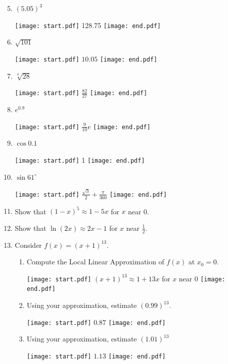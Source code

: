 \documentclass[12pt]{article}
\begin{document}
\begin{enumerate}
\setcounter{enumi}{4}

\item $(5.05)^3$ 

\texttt{[image: start.pdf]}
{{128.75}}
\texttt{[image: end.pdf]}


\item $\sqrt{101}$ 

\texttt{[image: start.pdf]}
{{$10.05$}}
\texttt{[image: end.pdf]}


\item $\sqrt[3]{28}$ 

\texttt{[image: start.pdf]}
{{$\frac{82}{27}$}}
\texttt{[image: end.pdf]}


\item $e^{0.9}$ 

\texttt{[image: start.pdf]}
{{$\frac{9}{10}e$}}
\texttt{[image: end.pdf]}


\item $\cos{0.1}$

\texttt{[image: start.pdf]}
{{1}}
\texttt{[image: end.pdf]}


\item $\sin{61^{\circ}}$ 

\texttt{[image: start.pdf]}
{{$\frac{\sqrt{3}}{2}+\frac{\pi}{360} $}}
\texttt{[image: end.pdf]}


\item Show that $(1-x)^5 \approx 1-5x$ for $x$ near 0.

\item Show that $\ln{(2x)} \approx 2x-1$ for $x$ near $\frac{1}{2}$.

\item Consider $f(x)=(x+1)^{13}$.

\begin{enumerate}

\item Compute the Local Linear Approximation of $f(x)$ at $x_0=0$.

\texttt{[image: start.pdf]}
{{$(x+1)^{13} \approx 1+13x$ for $x$ near 0}}
\texttt{[image: end.pdf]}


\item Using your approximation, estimate $(0.99)^{13}$.

\texttt{[image: start.pdf]}
{{$0.87$}}
\texttt{[image: end.pdf]}


\item Using your approximation, estimate $(1.01)^{13}$

\texttt{[image: start.pdf]}
{{$1.13$}}
\texttt{[image: end.pdf]}



\end{enumerate}
\end{enumerate}
\end{document}
